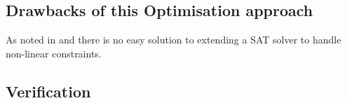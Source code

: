 \subsection{Drawbacks of this Optimisation approach}

As noted in \cite{le_berre_dependency_2009} and \cite{leBerre2010} there is no easy solution to extending a SAT solver to handle non-linear constraints.






\subsection{Verification}











